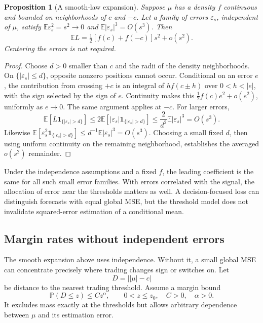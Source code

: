 \documentclass[11pt]{article}
\theoremstyle{plain}
\newtheorem{proposition}[theorem]{Proposition}
\theoremstyle{definition}
\theoremstyle{remark}
\newcommand{\E}{\mathbb E}
\begin{document}
\begin{proposition}[A smooth-law expansion]\label{prop:smooth}
Suppose \(\mu\) has a density \(f\) continuous and bounded on
neighborhoods of \(c\) and \(-c\). Let a family of errors
\(\varepsilon_s\), independent of \(\mu\), satisfy
\(\E\varepsilon_s^2=s^2\to0\) and
\(\E|\varepsilon_s|^3=O(s^3)\). Then
\begin{equation}\label{eq:smooth}
\E L=\tfrac12[f(c)+f(-c)]s^2+o(s^2).
\end{equation}
Centering the errors is not required.
\end{proposition}
\begin{proof}
Choose \(d>0\) smaller than \(c\) and the radii of the density
neighborhoods. On \(\{|\varepsilon_s|\le d\}\), opposite nonzero
positions cannot occur. Conditional on an error \(e\), the contribution
from crossing \(+c\) is an integral of \(h f(c\pm h)\) over
\(0<h<|e|\), with the sign selected by the sign of \(e\).
Continuity makes this
\(\frac12 f(c)e^2+o(e^2)\), uniformly as \(e\to0\).
The same argument applies at \(-c\).
For larger errors,
\[
\E[L\mathbf1_{\{|\varepsilon_s|>d\}}]
\le2\E[|\varepsilon_s|\mathbf1_{\{|\varepsilon_s|>d\}}]
\le\frac{2}{d^2}\E|\varepsilon_s|^3=O(s^3).
\]
Likewise
\(\E[\varepsilon_s^2\mathbf1_{\{|\varepsilon_s|>d\}}]
\le d^{-1}\E|\varepsilon_s|^3=O(s^3)\).
Choosing a small fixed \(d\), then using uniform continuity on the
remaining neighborhood, establishes the averaged \(o(s^2)\) remainder.
\end{proof}

Under the independence assumptions and a fixed \(f\), the leading
coefficient is the same for all such small error families.
With errors correlated with the signal, the allocation of error near
the thresholds matters as well. A decision-focused loss can distinguish
forecasts with equal global MSE, but the threshold model does not
invalidate squared-error estimation of a conditional mean.

\subsection{Margin rates without independent errors}

The smooth expansion above uses independence. Without it, a small
global MSE can concentrate precisely where trading changes sign or
switches on. Let
\[
D=\big||\mu|-c\big|
\]
be distance to the nearest trading threshold. Assume a margin bound
\begin{equation}\label{eq:marginassumption}
\mathbb P(D\le z)\le C z^\alpha,\qquad 0<z\le z_0,
\quad C>0,\quad\alpha>0.
\end{equation}
It excludes mass exactly at the thresholds but allows arbitrary
dependence between \(\mu\) and its estimation error.
\end{document}
